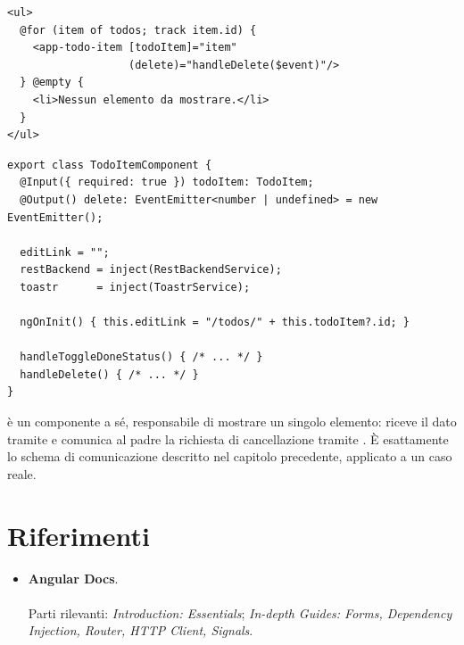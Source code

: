 \begin{affianco}[0.44][c]
\codicepiccolo
\begin{lstlisting}[style=html, name=todo-page.component.html]
<ul>
  @for (item of todos; track item.id) {
    <app-todo-item [todoItem]="item"
                   (delete)="handleDelete($event)"/>
  } @empty {
    <li>Nessun elemento da mostrare.</li>
  }
</ul>
\end{lstlisting}
\risultato
\begin{immagine}
\end{immagine}
\end{affianco}

\begin{lstlisting}[style=ts, name=todo-item.component.ts]
export class TodoItemComponent {
  @Input({ required: true }) todoItem: TodoItem;
  @Output() delete: EventEmitter<number | undefined> = new EventEmitter();

  editLink = "";
  restBackend = inject(RestBackendService);
  toastr      = inject(ToastrService);

  ngOnInit() { this.editLink = "/todos/" + this.todoItem?.id; }

  handleToggleDoneStatus() { /* ... */ }
  handleDelete() { /* ... */ }
}
\end{lstlisting}

 è un componente a sé, responsabile di mostrare un singolo
elemento: riceve il dato tramite  e comunica al padre la richiesta
di cancellazione tramite . È esattamente lo schema di
comunicazione descritto nel capitolo precedente, applicato a un caso reale.


\section{Riferimenti}

\begin{itemize}
  \item \textbf{Angular Docs}. \\
         \\
        Parti rilevanti: \textit{Introduction: Essentials}; \textit{In-depth
        Guides: Forms, Dependency Injection, Router, HTTP Client, Signals}.
\end{itemize}
